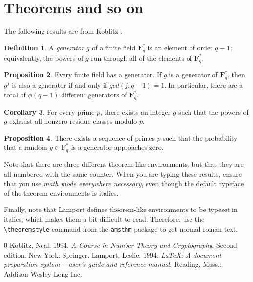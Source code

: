 \documentclass[10pt,a4paper]{article}
\theoremstyle{definition}
\newtheorem{definition}{Definition}
\newtheorem{proposition}[definition]{Proposition}
\newtheorem{corollary}[definition]{Corollary}
\begin{document}
	\section{Theorems and so on}
	The following results are from Koblitz \cite[pp. 34--35]{koblitz}.
	\begin{definition}
		A \emph{generator} $g$ of a finite field $\mathbf{F}_q^*$ is an element
		of order $q - 1$; equivalently, the powers of $g$ run through all of the
		elements of $\mathbf{F}_q^*$.
	\end{definition}
	\begin{proposition}
		Every finite field has a generator. If $g$ is a generator of 
		$\mathbf{F}_q^*$, then $g^j$ is also a generator if and only if $gcd(j, q - 1) = 1$.
		In particular, there are a total of $\phi(q - 1)$ different generators
		of $\mathbf{F}_q^*$.
	\end{proposition}
	\begin{corollary}
		For every prime $p$, there exists an integer $g$ such that the powers
		of $g$ exhaust all nonzero residue classes modulo $p$.
	\end{corollary}
	\begin{proposition}
		There exists a sequence of primes $p$ such that the probability
		that a random $g \in \mathbf{F}_q^*$ is a generator approaches zero.
	\end{proposition}

	Note that there are three different theorem-like environments, but that they
	are all numbered with the same counter. When you are typing these results,
	ensure that you use \emph{math mode everywhere necessary}, even though the default
	typeface of the theorem environments is italics.

	Finally, note that Lamport \cite{lamport} defines theorem-like environments to be
	typeset in italics, which makes them a bit difficult to read. Therefore, use
	the	\verb$\theoremstyle$ command from the \texttt{amsthm} package to
	get normal roman text.

	\begin{thebibliography}{0}
		 Koblitz, Neal. 1994. \emph{A Course in Number Theory
			and Cryptography}. 
			Second edition. New York: Springer.
		 Lamport, Leslie. 1994. \emph{\LaTeX: A document
			preparation system -- user's guide and reference manual}.
			Reading, Mass.: Addison-Wesley Long Inc.
	\end{thebibliography}

    
\end{document}
